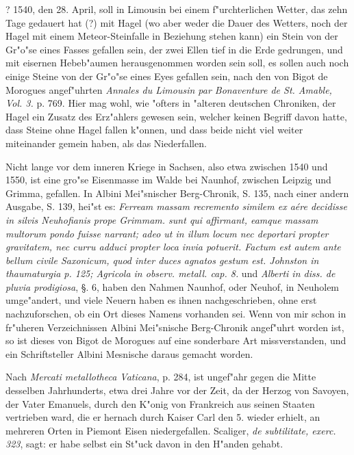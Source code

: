 \documentclass[a4paper, 11pt, oneside, polutonikogreek, german]{article}
\begin{document}
? 1540, den 28. April, soll in Limousin bei einem f"urchterlichen Wetter, das zehn Tage gedauert hat (?) mit Hagel (wo aber weder die Dauer des Wetters, noch der Hagel mit einem Meteor-Steinfalle in Beziehung stehen kann) ein Stein von der Gr"o"se eines Fasses gefallen sein, der zwei Ellen tief in die Erde gedrungen, und mit eisernen Hebeb"aumen herausgenommen worden sein soll, es sollen auch noch einige Steine von der Gr"o"se eines Eyes gefallen sein, nach den von Bigot de Morogues angef"uhrten \emph{Annales du Limousin par Bonaventure de St. Amable, Vol. 3.} p. 769. Hier mag wohl, wie "ofters in "alteren deutschen Chroniken, der Hagel ein Zusatz des Erz"ahlers gewesen sein, welcher keinen Begriff davon hatte, dass Steine ohne Hagel fallen k"onnen, und dass beide nicht viel weiter miteinander gemein haben, als das Niederfallen.

Nicht lange vor dem inneren Kriege in Sachsen, also etwa zwischen 1540 und 1550, ist eine gro"se Eisenmasse im Walde bei Naunhof, zwischen Leipzig und Grimma, gefallen. In Albini Mei"snischer Berg-Chronik, S. 135, nach einer andern Ausgabe, S. 139, hei"st es: \emph{Ferream massam recremento similem ex aére decidisse in silvis Neuhofianis prope Grimmam. sunt qui affirmant, eamque massam multorum pondo fuisse narrant; adeo ut in illum locum nec deportari propter gravitatem, nec curru adduci propter loca invia potuerit. Factum est autem ante bellum civile Saxonicum, quod inter duces agnatos gestum est. Johnston in thaumaturgia p. 125; Agricola in observ. metall. cap. 8.} und \emph{Alberti in diss. de pluvia prodigiosa}, §. 6, haben den Nahmen Naunhof, oder Neuhof, in Neuholem umge"andert, und viele Neuern haben es ihnen nachgeschrieben, ohne erst nachzuforschen, ob ein Ort dieses Namens vorhanden sei. Wenn von mir schon in fr"uheren Verzeichnissen Albini Mei"snische Berg-Chronik angef"uhrt worden ist, so ist dieses von Bigot de Morogues auf eine sonderbare Art missverstanden, und ein Schriftsteller Albini Mesnische daraus gemacht worden.

Nach \emph{Mercati metallotheca Vaticana}, p. 284, ist ungef"ahr gegen die Mitte desselben Jahrhunderts, etwa drei Jahre vor der Zeit, da der Herzog von Savoyen, der Vater Emanuels, durch den K"onig von Frankreich aus seinen Staaten vertrieben ward, die er hernach durch Kaiser Carl den 5. wieder erhielt, an mehreren Orten in Piemont Eisen niedergefallen. Scaliger, \emph{de subtilitate, exerc. 323}, sagt: er habe selbst ein St"uck davon in den H"anden gehabt.
\end{document}
